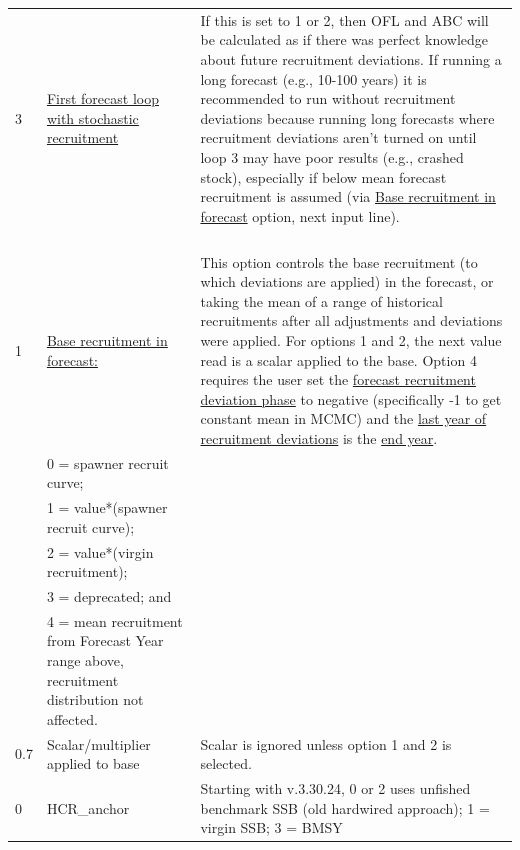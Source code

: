 \begin{landscape}
{\begin{longtable}{p{2cm} p{7cm} p{12cm}}
  \hline
  3 \Tstrut & \hyperlink{appendB}{First forecast loop with stochastic recruitment} & \multirow{1}{1cm}[-0.25cm]{\parbox{12cm}{If this is set to 1 or 2, then OFL and ABC will be calculated as if there was perfect knowledge about future recruitment deviations. If running a long forecast (e.g., 10-100 years) it is recommended to run without recruitment deviations because running long forecasts where recruitment deviations aren't turned on until loop 3 may have poor results (e.g., crashed stock), especially if below mean forecast recruitment is assumed (via \hyperlink{FcastRecruitment}{Base recruitment in forecast} option, next input line).}} \Bstrut\\
    & & \\
    & & \\
    & & \\
    & & \Bstrut\\

  \hline
  1 \Tstrut & \hyperlink{ForeSpawn}{Base recruitment in forecast:} \hypertarget{FcastRecruitment}{} & \multirow{1}{1cm}[-0.25cm]{\parbox{12cm}{This option controls the base recruitment (to which deviations are applied) in the forecast, or taking the mean of a range of historical recruitments after all adjustments and deviations were applied. For options 1 and 2, the next value read is a scalar applied to the base. Option 4 requires the user set the \hyperlink{FcastRecDevPhase}{forecast recruitment deviation phase} to negative (specifically -1 to get constant mean in MCMC) and the \hyperlink{RecDevEndYear}{last year of recruitment deviations} is the \hyperlink{EndYear}{end year}.}} \\
    & 0 = spawner recruit curve; & \\
    & 1 = value*(spawner recruit curve); & \\
    & 2 = value*(virgin recruitment); & \\
    & 3 = deprecated; and & \\
    & 4 = mean recruitment from Forecast Year range above, recruitment distribution not affected. & \Bstrut\\

  \hline
  0.7 \Tstrut & Scalar/multiplier applied to base & \multirow{1}{1cm}[-0.05cm]{\parbox{12cm}{Scalar is ignored unless option 1 and 2 is selected.}} \Bstrut\\

  \hline
  0 & HCR\_anchor & Starting with v.3.30.24, 0 or 2 uses unfished benchmark SSB (old hardwired approach); 1 = virgin SSB; 3 = BMSY \Tstrut\Bstrut\\
  

\end{longtable}}
\end{landscape}
